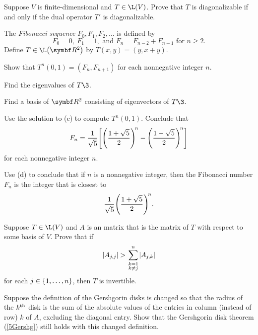 \begin{exercises}
\exercise
Suppose $V$ is finite-dimensional and $T \in \L(V)$. Prove that $T$ is diagonalizable if and only if the dual operator $T'$ is diagonalizable.


\exercise
The \emph{Fibonacci sequence} $F_0, F_1, F_2, \dots$ is defined by \label{Fibonacci}
\[
F_0 = 0,\ F_1 = 1, \text{ and }F_n = F_{n-2} + F_{n-1} \text{\ for\ } n \ge 2.
\]
Define $T \in \L\paren[\big]{\R2}$ by $T(x, y) = (y, x+y)$.
\begin{subtheorem}
\item
Show that $T^n(0, 1) = (F_n, F_{n+1})$ for each nonnegative integer $n$.
\item
Find the eigenvalues of $T\3$.
\item
Find a basis of $\R2$ consisting of eigenvectors of $T\3$.
\item
Use the solution to (c) to compute $T^n(0, 1)$. Conclude that
\[
F_n = \frac{1}{\sqrt{5}} \Biggl[ \paren[\Bigg]{ \frac{1 + \sqrt{5}}{2} }^{\!n}
-\paren[\Bigg]{ \frac{1 - \sqrt{5}}{2} }^{\!n} \Biggr]
\]
for each nonnegative integer $n$.
\item
Use (d) to conclude that if $n$ is a nonnegative integer, then the Fibonacci number $F_n$ is the integer that is closest to
\[
\frac{1}{\sqrt{5}}  \paren[\Bigg]{ \frac{1 + \sqrt{5}}{2} }^{\!n}.
\]
\end{subtheorem}


\exercise
Suppose $T \in \L(V)$ and $A$ is an  matrix that is the matrix of $T$ with respect to some basis of $V$. Prove that if
\[
\lvert A_{j,j} \rvert > \sum_{\scriptstyle k=1 \atop \scriptstyle k\ne j}^n \lvert A_{j,k}\rvert
\]
for each $j \in \{1, \ldots, n\}$, then $T$ is invertible.\label{5Gershgor}


\exercise
Suppose the definition of the Gershgorin disks is changed so that the radius of the $k^{\text{{th}}}$ disk is the sum of the absolute values of the entries in column (instead of row) $k$ of $A$, excluding the diagonal entry. Show that the Gershgorin disk theorem (\ref{5Gershg}) still holds with this changed definition.\label{5Gershgo}


\end{exercises}

